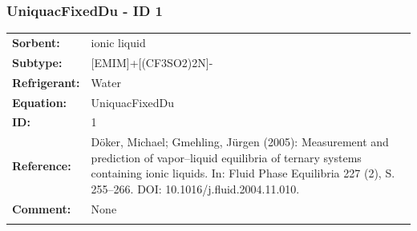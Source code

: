\subsubsection{UniquacFixedDu - ID 1}
%
\begin{tabular}[l]{|lp{11.5cm}|}
\hline
\addlinespace

\textbf{Sorbent:} & ionic liquid \\
\textbf{Subtype:} & [EMIM]+[(CF3SO2)2N]- \\
\textbf{Refrigerant:} & Water \\
\textbf{Equation:} & UniquacFixedDu \\
\textbf{ID:} & 1 \\
\textbf{Reference:} & Döker, Michael; Gmehling, Jürgen (2005): Measurement and prediction of vapor–liquid equilibria of ternary systems containing ionic liquids. In: Fluid Phase Equilibria 227 (2), S. 255–266. DOI: 10.1016/j.fluid.2004.11.010. \\
\textbf{Comment:} & None \\

\addlinespace
\hline
\end{tabular}
\newline

